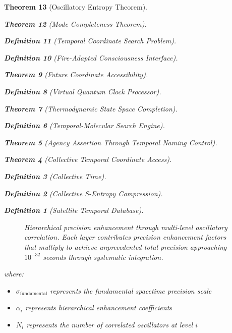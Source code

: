 \documentclass[12pt,a4paper]{article}
\newtheorem{theorem}{Theorem}[section]
\newtheorem{definition}[theorem]{Definition}
\begin{document}
\begin{theorem}[Oscillatory Entropy Theorem]
\begin{theorem}[Mode Completeness Theorem]
\begin{enumerate}
\begin{definition}[Temporal Coordinate Search Problem]
\begin{algorithm}
\begin{definition}[Fire-Adapted Consciousness Interface]
\begin{theorem}[Future Coordinate Accessibility]
\begin{definition}[Virtual Quantum Clock Processor]
\begin{itemize}
\begin{itemize}
\begin{theorem}[Thermodynamic State Space Completion]
\begin{definition}[Temporal-Molecular Search Engine]
\begin{theorem}[Agency Assertion Through Temporal Naming Control]
\begin{remark}
\begin{theorem}[Collective Temporal Coordinate Access]
\begin{definition}[Collective Time]
\begin{definition}[Collective S-Entropy Compression]
\begin{definition}[Satellite Temporal Database]
\begin{algorithm}
\begin{table}[h]
{{\begin{figure}[h]
\caption{Hierarchical precision enhancement through multi-level oscillatory correlation. Each layer contributes precision enhancement factors that multiply to achieve unprecedented total precision approaching $10^{-32}$ seconds through systematic integration.}
\label{fig:hierarchical_precision}
\end{figure}

where:
\begin{itemize}
\item $\sigma_{\text{fundamental}}$ represents the fundamental spacetime precision scale
\item $\alpha_i$ represents hierarchical enhancement coefficients
\item $N_i$ represents the number of correlated oscillators at level $i$
\end{itemize}

}}
\end{table}
\end{algorithm}
\end{definition}
\end{definition}
\end{definition}
\end{theorem}
\end{remark}
\end{theorem}
\end{definition}
\end{theorem}
\end{itemize}
\end{itemize}
\end{definition}
\end{theorem}
\end{definition}
\end{algorithm}
\end{definition}
\end{enumerate}
\end{theorem}
\end{theorem}
\end{document}
